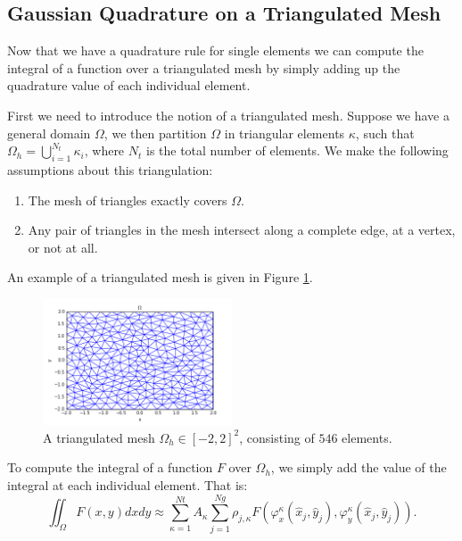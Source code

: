 \documentclass{uonmathreport}
\begin{document}
\subsection{Gaussian Quadrature on a Triangulated Mesh}
\label{subsec:GQuad_t_mesh}

Now that we have a quadrature rule for single elements we can compute the integral of a function over a triangulated mesh by simply adding up the quadrature value of each individual element.

First we need to introduce the notion of a triangulated mesh. Suppose we have a general domain $\Omega$, we then partition $\Omega$ in triangular elements $\kappa$, such that $\Omega_h = \bigcup_{i=1}^{N_t} \kappa_{i}$, where $N_t$ is the total number of elements. We make the following assumptions about this triangulation:
\begin{enumerate}
	\item The mesh of triangles exactly covers $\Omega$.
	\item Any pair of triangles in the mesh intersect along a complete edge, at a vertex, or not at all.
\end{enumerate}
An example of a triangulated mesh is given in Figure \ref{fig:tri_mesh}.
\begin{figure}[h]
	\begin{center}
		\includegraphics[width=0.5\textwidth]{Figures/tri_mesh.png}
	\end{center}
	\caption{A triangulated mesh $\Omega_h \in [-2,2]^2$, consisting of $546$ elements.}
	\label{fig:tri_mesh}
\end{figure}
To compute the integral of a function $F$ over $\Omega_h$, we simply add the value of the integral at each individual element. That is:
\begin{equation}\label{eqn:gquad_tmesh}
\iint_{\Omega} F(x, y) dxdy \approx \sum_{\kappa=1}^{Nt} A_{\kappa}\sum_{j=1}^{Ng} \rho_{j, \kappa} F(\varphi^{\kappa}_x(\hat x_j,\hat y_j), \varphi^{\kappa}_y(\hat x_j,\hat y_j)).
\end{equation}
\end{document}
